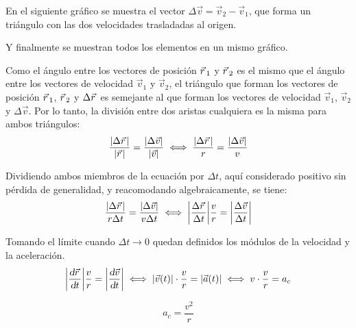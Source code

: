 \begin{center}
    \def\svgwidth{0.8\linewidth}
    
\end{center}

En el siguiente gráfico se muestra el vector $\Delta \Vec{v} = \Vec{v}_2-\Vec{v}_1$, que forma un triángulo con las dos velocidades trasladadas al origen.

\begin{center}
    \def\svgwidth{0.8\linewidth}
    
\end{center}

Y finalmente se muestran todos los elementos en un mismo gráfico.

\begin{center}
    \def\svgwidth{0.8\linewidth}
    
\end{center}

Como el ángulo entre los vectores de posición $\vec{r}\hspace{0.05cm}_1$ y $\vec{r}\hspace{0.05cm}_2$ es el mismo que el ángulo entre los vectores de velocidad $\Vec{v}_1$ y $\Vec{v}_2$, el triángulo que forman los vectores de posición $\vec{r}\hspace{0.05cm}_1$, $\vec{r}\hspace{0.05cm}_2$ y $\Delta \vec{r}\hspace{0.05cm}$ es semejante al que forman los vectores de velocidad $\Vec{v}_1$, $\Vec{v}_2$ y $\Delta \Vec{v}$.
Por lo tanto, la división entre dos aristas cualquiera es la misma para ambos triángulos:
\[
  \dfrac{{\left| {\Delta\vec{r}\hspace{0.05cm}} \right|}}{{\left| {\vec{r}\hspace{0.05cm}} \right|}} = \dfrac{{\left| {\Delta\Vec{v}} \right|}}{{\left| {\Vec{v}} \right|}}
  \iff
  \dfrac{{\left| {\Delta\vec{r}\hspace{0.05cm}} \right|}}{r} = \dfrac{{\left| {\Delta\Vec{v}} \right|}}{v}
\]

Dividiendo ambos miembros de la ecuación por $\Delta t$, aquí considerado positivo sin pérdida de generalidad, y reacomodando algebraicamente, se tiene:
\[
  \dfrac{{\left| {\Delta\vec{r}\hspace{0.05cm}} \right|}}{r \Delta t} = \dfrac{{\left| {\Delta \Vec{v}} \right|}}{v \Delta t}
  \iff
  {\left| {\dfrac{\Delta \vec{r}\hspace{0.05cm}}{\Delta t}} \right|} \dfrac{v}{r} = {\left| {\dfrac{\Delta \Vec{v}}{\Delta t}} \right|}
\]

Tomando el límite cuando $\Delta t \to 0$ quedan definidos los módulos de la velocidad y la aceleración.
\[
  {\left| {\dfrac{\textsl{d} \vec{r}\hspace{0.05cm}}{\textsl{d} t}} \right|} \dfrac{v}{r} = {\left| {\dfrac{\textsl{d} \Vec{v}}{\textsl{d} t}} \right|}
  \iff
  {\left| {\Vec{v}(t)} \right|} \cdot \dfrac{v}{r} = {\left| {\Vec{a}(t)} \right|}
  \iff
  v \cdot \dfrac{v}{r} = a_c
\]

\begin{mdframed}[style=PropertyFrame]
    \begin{prop}
        \label{prop:}
    \end{prop}
    \begin{equation*}
        a_c = \dfrac{v^2}{r}
    \end{equation*}
\end{mdframed}


